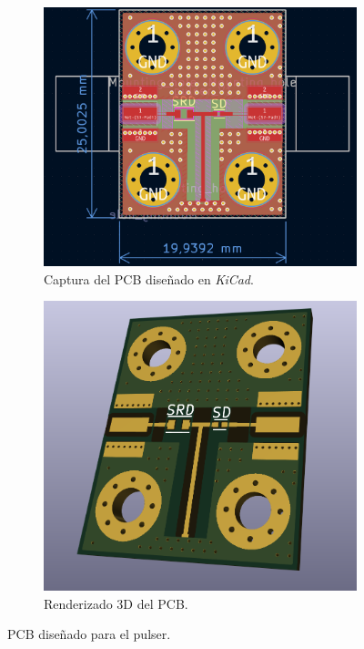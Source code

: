 \begin{figure}
    \centering

    \begin{subfigure}[b]{0.45\textwidth}
        \includegraphics[width=\textwidth]{images/pulser_layout.png}
        \caption{Captura del PCB diseñado en \textit{KiCad}.}
        \label{fig:pulser_layout}
    \end{subfigure}
    \hfill
    \begin{subfigure}[b]{0.45\textwidth}
        \includegraphics[width=\textwidth]{images/pulser_3d.png}
        \caption{Renderizado 3D del PCB.}
        \label{fig:pulser_3d}
    \end{subfigure}

    \caption{PCB diseñado para el pulser.}
    \label{fig:pulser_pcb}
\end{figure}

